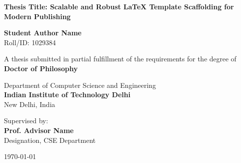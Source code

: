 \begin{titlepage}
\begin{center}
    \vspace*{1cm}
    
    
    \vspace{1.5cm}
    
    {\huge \bfseries \color{primary} Thesis Title: Scalable and Robust LaTeX Template Scaffolding for Modern Publishing}
    
    \vspace{1.5cm}
    
    {\Large \bfseries Student Author Name} \\
    \vspace{0.2cm}
    {Roll/ID: 1029384}
    
    \vspace{1.5cm}
    
    {A thesis submitted in partial fulfillment of the requirements for the degree of} \\
    \vspace{0.3cm}
    {\large \bfseries \color{secondary} Doctor of Philosophy}
    
    \vspace{1.5cm}
    
    {\large Department of Computer Science and Engineering} \\
    \vspace{0.2cm}
    {\large \bfseries \color{primary} Indian Institute of Technology Delhi} \\
    \vspace{0.1cm}
    {New Delhi, India}
    
    \vfill
    
    {Supervised by:} \\
    {\large \bfseries Prof. Advisor Name} \\
    {Designation, CSE Department}
    
    \vspace{1cm}
    
    {\large \today}
    
\end{center}
\end{titlepage}
